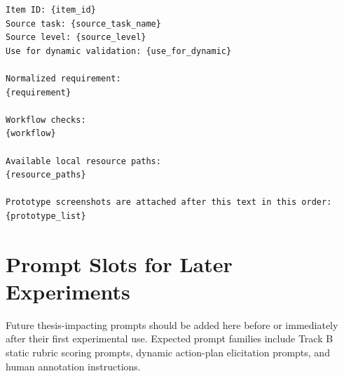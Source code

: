 \begin{verbatim}
Item ID: {item_id}
Source task: {source_task_name}
Source level: {source_level}
Use for dynamic validation: {use_for_dynamic}

Normalized requirement:
{requirement}

Workflow checks:
{workflow}

Available local resource paths:
{resource_paths}

Prototype screenshots are attached after this text in this order:
{prototype_list}
\end{verbatim}
\endgroup

\section{Prompt Slots for Later Experiments}
\label{app:future-prompt-slots}

Future thesis-impacting prompts should be added here before or immediately after
their first experimental use. Expected prompt families include Track B static
rubric scoring prompts, dynamic action-plan elicitation prompts, and human
annotation instructions.
